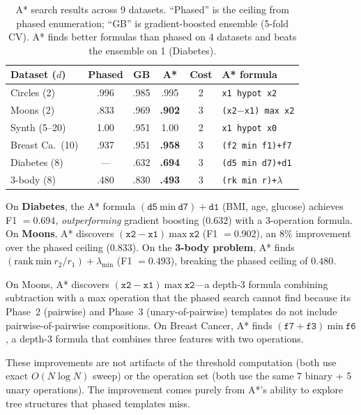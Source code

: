 \documentclass[journal]{IEEEtran}
\begin{document}
\begin{table}[h]
\caption{A* search results across 9 datasets. ``Phased'' is the
ceiling from phased enumeration; ``GB'' is gradient-boosted ensemble
(5-fold CV). A* finds better formulas than phased on 4 datasets
and beats the ensemble on 1 (Diabetes).}
\label{tab:astar_vs_phased}
\scriptsize
\begin{tabular}{@{}lccccl@{}}
\toprule
Dataset ($d$) & Phased & GB & A* & Cost & A* formula \\
\midrule
Circles (2) & .996 & .985 & .995 & 2 & \texttt{x1 hypot x2} \\
Moons (2) & .833 & .969 & \textbf{.902} & 3 & \texttt{(x2$-$x1) max x2} \\
Synth (5--20) & 1.00 & .951 & 1.00 & 2 & \texttt{x1 hypot x0} \\
Breast Ca.\ (10) & .937 & .951 & \textbf{.958} & 3 & \texttt{(f2 min f1)+f7} \\
Diabetes (8) & --- & .632 & \textbf{.694} & 3 & \texttt{(d5 min d7)+d1} \\
3-body (8) & .480 & .830 & \textbf{.493} & 3 & \texttt{(rk min r)+$\lambda$} \\
\bottomrule
\end{tabular}
\end{table}

On \textbf{Diabetes}, the A* formula $(\texttt{d5}~\mathrm{min}~
\texttt{d7}) + \texttt{d1}$ (BMI, age, glucose) achieves F1 $= 0.694$,
\emph{outperforming} gradient boosting ($0.632$) with a 3-operation
formula. On \textbf{Moons}, A* discovers
$(\texttt{x2} - \texttt{x1})~\mathrm{max}~\texttt{x2}$ (F1 $= 0.902$),
an 8\% improvement over the phased ceiling ($0.833$). On the
\textbf{3-body problem}, A* finds
$(\mathrm{rank}~\mathrm{min}~r_2/r_1) + \lambda_\mathrm{min}$
(F1 $= 0.493$), breaking the phased ceiling of $0.480$.

On Moons, A* discovers $(\texttt{x2} - \texttt{x1})~\mathrm{max}~\texttt{x2}$---a
depth-3 formula combining subtraction with a max operation that the
phased search cannot find because its Phase~2 (pairwise) and Phase~3
(unary-of-pairwise) templates do not include pairwise-of-pairwise
compositions. On Breast Cancer, A* finds
$(\texttt{f7} + \texttt{f3})~\mathrm{min}~\texttt{f6}$, a depth-3
formula that combines three features with two operations.

These improvements are not artifacts of the threshold computation
(both use exact $O(N\log N)$ sweep) or the operation set (both use
the same 7 binary + 5 unary operations). The improvement comes
purely from A*'s ability to explore tree structures that phased
templates miss.
\end{document}
